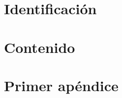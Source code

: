 
\newcommand{\nombrearchivo}{Plantilla de prueba}
\newcommand{\titulodocumento}{Plantilla de prueba en \LaTeX}
\newcommand{\autor}{Rafael Healy Chacón}
\newcommand{\fecha}{Marzo 2013}





\pagestyle{fancy}
\setcounter{page}{1}
\section*{Identificación}

\clearpage
\tableofcontents
{}
\listoffigures
\listoftables

\clearpage
{}
\setcounter{page}{1}

\section{Contenido}

\clearpage



\clearpage
\appendix
\noappendicestocpagenum
\addappheadtotoc
\appendixpage
\section{Primer apéndice}


\clearpage


